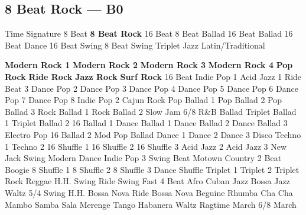 \subsection{8 Beat Rock --- \UiKey{\II}\UiKey{\MET}B0}
Time Signature
8 Beat
\textbf{8 Beat Rock}
16 Beat
8 Beat Ballad
16 Beat Ballad
16 Beat Dance
16 Beat Swing
8 Beat Swing
Triplet
Jazz
Latin/Traditional





























\textbf{Modern Rock 1}
\textbf{Modern Rock 2}
\textbf{Modern Rock 3}
\textbf{Modern Rock 4}
\textbf{Pop Rock}
\textbf{Ride Rock}
\textbf{Jazz Rock}
\textbf{Surf Rock}
16 Beat
Indie Pop 1
Acid Jazz 1
Ride Beat 3
Dance Pop 2
Dance Pop 3
Dance Pop 4
Dance Pop 5
Dance Pop 6
Dance Pop 7
Dance Pop 8
Indie Pop 2
Cajun Rock
Pop Ballad 1
Pop Ballad 2
Pop Ballad 3
Rock Ballad 1
Rock Ballad 2
Slow Jam
6/8 R\&B Ballad
Triplet Ballad 1
Triplet Ballad 2
16 Ballad 1
Dance Ballad 1
Dance Ballad 2
Dance Ballad 3
Electro Pop
16 Ballad 2
Mod Pop Ballad
Dance 1
Dance 2
Dance 3
Disco
Techno 1
Techno 2
16 Shuffle 1
16 Shuffle 2
16 Shuffle 3
Acid Jazz 2
Acid Jazz 3
New Jack Swing
Modern Dance
Indie Pop 3
Swing Beat
Motown
Country 2 Beat
Boogie
8 Shuffle 1
8 Shuffle 2
8 Shuffle 3
Dance Shuffle
Triplet 1
Triplet 2
Triplet Rock
Reggae
H.H. Swing
Ride Swing
Fast 4 Beat
Afro Cuban
Jazz Bossa
Jazz Waltz
5/4 Swing
H.H. Bossa Nova
Ride Bossa Nova
Beguine
Rhumba
Cha Cha
Mambo
Samba
Sala
Merenge
Tango
Habanera
Waltz
Ragtime
March
6/8 March
